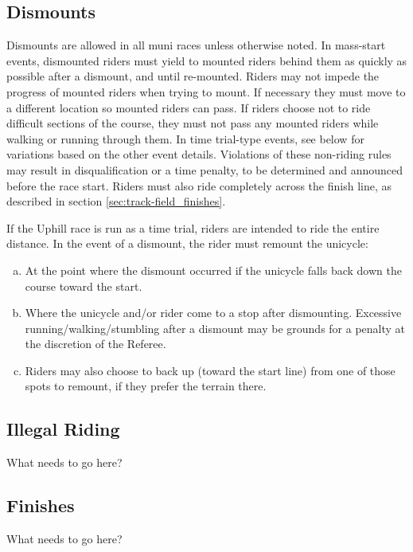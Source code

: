 \subsection{Dismounts}
Dismounts are allowed in all muni races unless otherwise noted.
In mass-start events, dismounted riders must yield to mounted riders behind them as quickly as possible after a dismount, and until re-mounted.
Riders may not impede the progress of mounted riders when trying to mount.
If necessary they must move to a different location so mounted riders can pass.
If riders choose not to ride difficult sections of the course, they must not pass any mounted riders while walking or running through them.
In time trial-type events, see below for variations based on the other event details.
Violations of these non-riding rules may result in disqualification or a time penalty, to be determined and announced before the race start.
Riders must also ride completely across the finish line, as described in section \ref{sec:track-field_finishes}.

If the Uphill race is run as a time trial, riders are intended to ride the entire distance.
In the event of a dismount, the rider must remount the unicycle:
\begin{enumerate}[(a)]
\item At the point where the dismount occurred if the unicycle falls back down the course toward the start.
\item Where the unicycle and/or rider come to a stop after dismounting.
Excessive running/walking/stumbling after a dismount may be grounds for a
penalty at the discretion of the Referee.
\item Riders may also choose to back up (toward the start line) from one of those spots to remount, if they prefer the terrain there.
\end{enumerate}


\subsection{Illegal Riding}

\begin{framed}
What needs to go here?
\end{framed}

\subsection{Finishes}

\begin{framed}
What needs to go here?
\end{framed}

